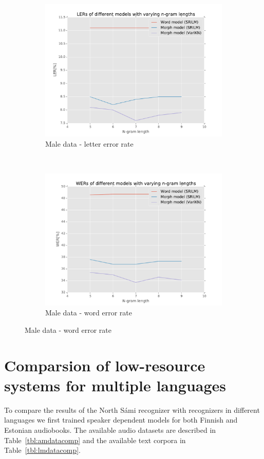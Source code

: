 \documentclass[b5paper]{article}
\newcommand{\ns}{{North Sámi }}
\begin{document}
\begin{figure}[h!]
\begin{subfigure}[b]{.4\textwidth}
\includegraphics[width=\textwidth]{figures/smeM-complete_wikipedia-ler}
\caption{Male data - letter error rate}
\end{subfigure}~
\begin{subfigure}[b]{.4\textwidth}
\includegraphics[width=\textwidth]{figures/smeM-complete_wikipedia-wer}
\caption{Male data - word error rate}
\end{subfigure}

\end{figure}

\section{Comparsion of low-resource systems for multiple languages}
To compare the results of the \ns recognizer with recognizers in different languages we first trained speaker dependent models for both Finnish and Estonian audiobooks. The available audio datasets are described in Table~\ref{tbl:amdatacomp} and the available text corpora in Table~\ref{tbl:lmdatacomp}.
\end{document}
